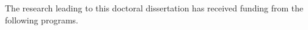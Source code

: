The research leading to this doctoral dissertation has received funding from the following programs.